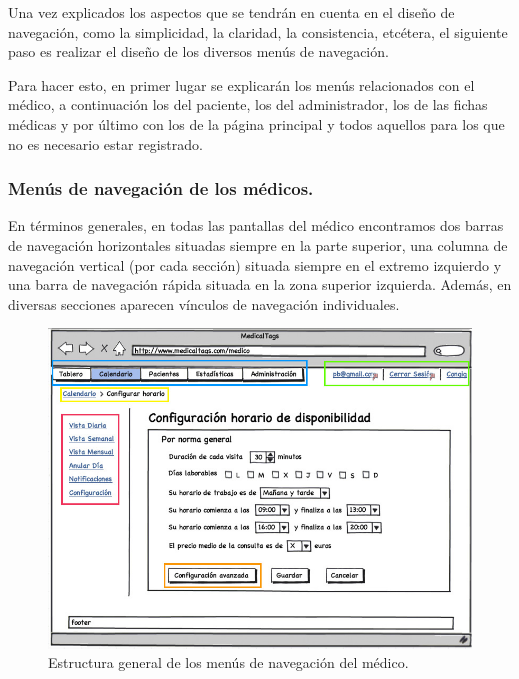 		Una vez explicados los aspectos que se tendrán en cuenta en el diseño de navegación, como la simplicidad, la claridad, la consistencia, etcétera, el siguiente paso es realizar el diseño de los diversos menús de navegación.
		
		Para hacer esto, en primer lugar se explicarán los menús relacionados con el médico, a continuación los del paciente, los del administrador, los de las fichas médicas y por último con los de la página principal y todos aquellos para los que no es necesario estar registrado.
		
		
	
		\subsubsection{Menús de navegación de los médicos.} %
		\label{par:nav_menus_de_navegacion_de_los_medicos}
		
			En términos generales, en todas las pantallas del médico encontramos dos barras de navegación horizontales situadas siempre en la parte superior, una columna de navegación vertical (por cada sección) situada siempre en el extremo izquierdo y una barra de navegación rápida situada en la zona superior izquierda. Además, en diversas secciones aparecen vínculos de navegación individuales.
			
			\begin{figure}[H]
			  \centering
			    \includegraphics[width=15cm]{img/jpg/nav/medico.jpg}
			  \caption{Estructura general de los menús de navegación del médico.}
			  \label{fig:nav_medico}
			\end{figure}
			
